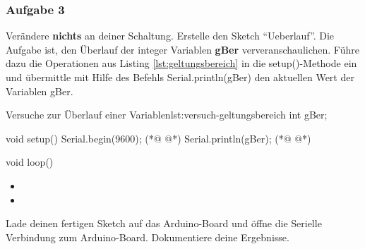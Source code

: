 \subsubsection{Aufgabe 3}
Verändere \textbf{nichts} an deiner Schaltung. Erstelle den Sketch ``Ueberlauf''. Die Aufgabe ist, den Überlauf  der integer Variablen \textbf{gBer} ververanschaulichen. Führe dazu die Operationen aus Listing \ref{lst:geltungsbereich} in die setup()-Methode ein und übermittle mit Hilfe des Befehls Serial.println(gBer) den aktuellen Wert der Variablen gBer.  

\begin{multicols}{2}  
\begin{arduinoCode}{Versuche zur Überlauf einer Variablen}{lst:versuch-geltungsbereich}
int gBer; 
  
void setup() {
  Serial.begin(9600);
          (*@  @*)
  Serial.println(gBer); (*@  @*)
}

void loop() {  
}
\end{arduinoCode}
\vfill\null 
\columnbreak

\null\vfill
\begin{itemize}
  \itemsep15pt
  \item[] 
  \item[] 
  

\end{itemize}
\vfill \null

\end{multicols}

Lade deinen fertigen Sketch auf das Arduino-Board und öffne die Serielle Verbindung zum Arduino-Board. Dokumentiere deine Ergebnisse.



